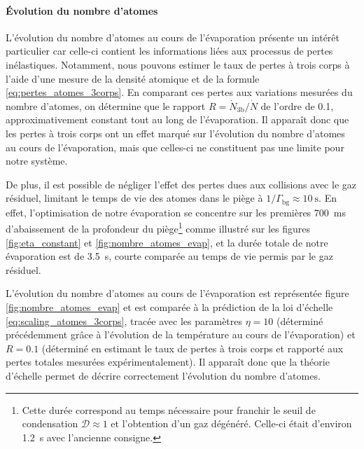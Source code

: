 \paragraph*{Évolution du nombre d'atomes}

L'évolution du nombre d'atomes au cours de l'évaporation présente un intérêt particulier car celle-ci contient les informations liées aux processus de pertes inélastiques. Notamment, nous pouvons estimer le taux de pertes à trois corps à l'aide d'une mesure de la densité atomique et de la formule \ref{eq:pertes_atomes_3corps}. En comparant ces pertes aux variations mesurées du nombre d'atomes, on détermine que le rapport $R=\dot{N}_{\mathrm{3b}}/\dot{N}$ de l'ordre de 0.1, approximativement constant tout au long de l'évaporation. Il apparaît donc que les pertes à trois corps ont un effet marqué sur l'évolution du nombre d'atomes au cours de l'évaporation, mais que celles-ci ne constituent pas une limite pour notre système. 

De plus, il est possible de négliger l'effet des pertes dues aux collisions avec le gaz résiduel, limitant le temps de vie des atomes dans le piège à $1/\Gamma_{\mathrm{bg}}\approx\SI{10}{\second}$. En effet, l'optimisation de notre évaporation se concentre sur les premières \SI{700}{\milli\second} d'abaissement de la profondeur du piège\footnote{Cette durée correspond au temps nécessaire pour franchir le seuil de condensation $\mathcal{D}\approx 1$ et l'obtention d'un gaz dégénéré. Celle-ci était d'environ \SI{1.2}{\second} avec l'ancienne consigne.} comme illustré sur les figures \ref{fig:eta_constant} et \ref{fig:nombre_atomes_evap}, et la durée totale de notre évaporation est de \SI{3.5}{\second}, courte comparée au temps de vie permis par le gaz résiduel.

L'évolution du nombre d'atomes au cours de l'évaporation est représentée figure \ref{fig:nombre_atomes_evap} et est comparée à la prédiction de la loi d'échelle \ref{eq:scaling_atomes_3corps}, tracée avec les paramètres $\eta=10$ (déterminé précédemment grâce à l'évolution de la température au cours de l'évaporation) et $R=0.1$ (déterminé en estimant le taux de pertes à trois corps et rapporté aux pertes totales mesurées expérimentalement). Il apparaît donc que la théorie d'échelle permet de décrire correctement l'évolution du nombre d'atomes. 


